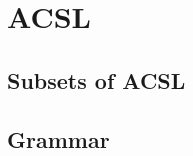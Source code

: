 
\section{ACSL}
\label{sec:acsl}

\subsection{Subsets of ACSL}
\label{sub:subsets_of_acsl}

\subsection{Grammar}
\label{sub:grammar}
